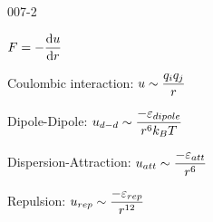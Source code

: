 \begin{mitframe}{007-2} %

    
    
    \begin{listone}
    
    	\item $\force = -\dfrac{\mathrm{d}\forcepot}{\mathrm{d}\pos}$      

      	\item Coulombic interaction: $\forcepot \sim \dfrac{\charge{i} \charge{j}}{\pos}$
	
     	\item Dipole-Dipole: $\forcepot_{d-d} \sim \dfrac{-\partpoten_{dipole}}{\pos^6\boltz\Temp}$      
      

      	\item Dispersion-Attraction: $\forcepot_{att} \sim \dfrac{-\partpoten_{att}}{\pos^6}$

     	\item Repulsion: $\forcepot_{rep} \sim \dfrac{-\partpoten_{rep}}{\pos^{12}}$
      
    \end{listone}
 
\end{mitframe}
